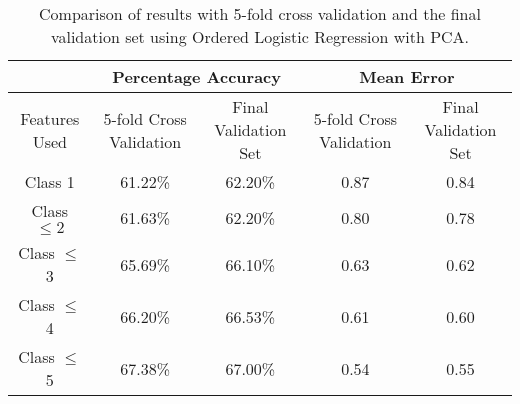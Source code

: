 \begin{table}[t]
\centering
\begin{tabular}{|c|c|c|c|c|}
\hline
& \multicolumn{2}{|c|}{Percentage Accuracy} & \multicolumn{2}{|c|}{Mean Error} \\ \hline
Features Used & 5-fold Cross Validation & Final Validation Set & 5-fold Cross Validation & Final Validation Set \\ \hline
Class 1        & 61.22\% & 62.20\% & 0.87 & 0.84 \\ \hline
Class $\leq 2$ & 61.63\% & 62.20\% & 0.80 & 0.78 \\ \hline
Class $\leq$ 3 & 65.69\% & 66.10\% & 0.63 & 0.62 \\ \hline
Class $\leq$ 4 & 66.20\% & 66.53\% & 0.61 & 0.60 \\ \hline
Class $\leq$ 5 & 67.38\% & 67.00\% & 0.54 & 0.55 \\ \hline
\end{tabular}
\caption{Comparison of results with 5-fold cross validation and the final validation set using Ordered Logistic Regression with PCA.}
\label{finaleval_table2}
\end{table}